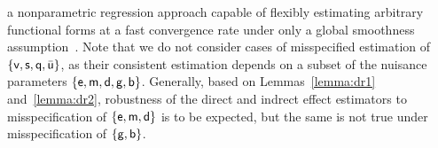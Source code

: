 a nonparametric regression approach capable of flexibly estimating arbitrary
functional forms at a fast convergence rate under only a global smoothness
assumption~\citep{vdl2017uniform, bibaut2019fast}.
Note that we do not consider cases of misspecified estimation of $\{\mathsf{v}, \mathsf{s},
\mathsf{q}, \bar{\mathsf{u}}\}$, as their consistent estimation depends on a subset of the
nuisance parameters $\{\mathsf{e}, \mathsf{m}, \mathsf{d}, \mathsf{g}, \mathsf{b}\}$. Generally, based on
Lemmas~\ref{lemma:dr1} and~\ref{lemma:dr2}, robustness of the direct and indrect
effect estimators to misspecification of $\{\mathsf{e}, \mathsf{m}, \mathsf{d}\}$ is to be expected, but
the same is not true under misspecification of $\{\mathsf{g}, \mathsf{b}\}$.

